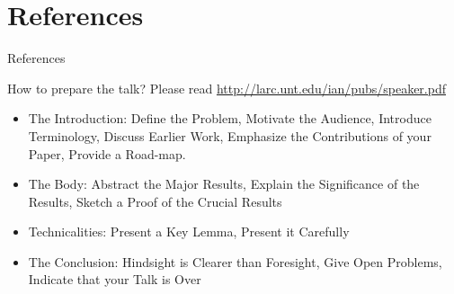 \documentclass[11pt]{beamer}              %
\begin{document}
\section*{References}
\begin{frame}{References}
\tiny


\end{frame}

\begin{frame}{How to prepare the talk?}
Please read \url{http://larc.unt.edu/ian/pubs/speaker.pdf}
\begin{itemize}
\item The Introduction:  Define the Problem,    Motivate the Audience,    Introduce Terminology,    Discuss Earlier Work,    Emphasize the Contributions of your Paper,    Provide a Road-map.
\item The Body:    Abstract the Major Results, Explain the Significance of the Results, Sketch a Proof of the Crucial Results
\item Technicalities: Present a Key Lemma, Present it Carefully
\item The Conclusion: Hindsight is Clearer than Foresight, Give Open Problems, Indicate that your Talk is Over
\end{itemize}

\end{frame}



\thankslide
\end{document}
